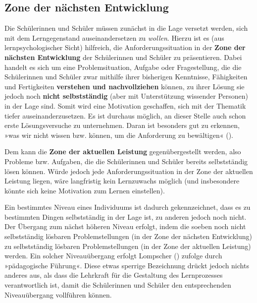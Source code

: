 \documentclass[
]{scrbook}
\theoremstyle{definition}
\theoremstyle{definition}
\theoremstyle{definition}
\theoremstyle{definition}
\theoremstyle{remark}
\begin{document}
\subsection{Zone der nächsten Entwicklung}\label{zone-der-nuxe4chsten-entwicklung}

Die Schülerinnen und Schüler müssen zunächst in die Lage versetzt werden, sich mit dem Lerngegenstand auseinandersetzen zu \emph{wollen}. Hierzu ist es (aus lernpsychologischer Sicht) hilfreich, die Anforderungssituation in der \textbf{Zone der nächsten Entwicklung} der Schülerinnen und Schüler zu präsentieren. Dabei handelt es sich um eine Problemsituation, Aufgabe oder Fragestellung, die die Schülerinnen und Schüler zwar mithilfe ihrer bisherigen Kenntnisse, Fähigkeiten und Fertigkeiten \textbf{verstehen und nachvollziehen} können, zu ihrer Lösung sie jedoch noch \textbf{nicht selbstständig} (aber mit Unterstützung wissender Personen) in der Lage sind. Somit wird eine Motivation geschaffen, sich mit der Thematik tiefer auseinanderzusetzen. Es ist durchaus möglich, an dieser Stelle auch schon erste Lösungsversuche zu unternehmen. Daran ist besonders gut zu erkennen, »was wir nicht wissen bzw. können, um die Anforderung zu bewältigen« ().

Dem kann die \textbf{Zone der aktuellen Leistung} gegenübergestellt werden, also Probleme bzw. Aufgaben, die die Schülerinnen und Schüler bereits selbstständig lösen können. Würde jedoch jede Anforderungssituation in der Zone der aktuellen Leistung liegen, wäre langfristig kein Lernzuwachs möglich (und insbesondere könnte sich keine Motivation zum Lernen einstellen).

Ein bestimmtes Niveau eines Individuums ist dadurch gekennzeichnet, dass es zu bestimmten Dingen selbstständig in der Lage ist, zu anderen jedoch noch nicht. Der Übergang zum nächst höheren Niveau erfolgt, indem die soeben noch nicht selbstständig lösbaren Problemstellungen (in der Zone der nächsten Entwicklung) zu selbstständig lösbaren Problemstellungen (in der Zone der aktuellen Leistung) werden. Ein solcher Niveauübergang erfolgt Lompscher () zufolge durch »pädagogische Führung«. Diese etwas sperrige Bezeichnung drückt jedoch nichts anderes aus, als dass die Lehrkraft für die Gestaltung des Lernprozesses verantwortlich ist, damit die Schülerinnen und Schüler den entsprechenden Niveauübergang vollführen können.
\end{document}

